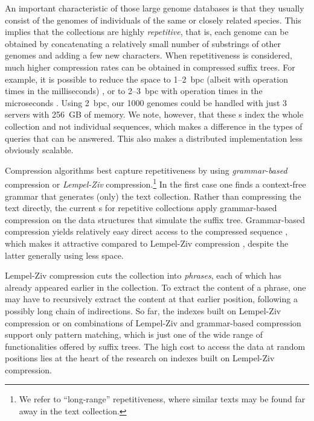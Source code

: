 An important characteristic of those large genome databases is that they
usually consist of the genomes of individuals of the same or closely related
species. This implies that the collections are highly \emph{repetitive}, that
is, each genome can be obtained by concatenating a relatively small number of
substrings of other genomes
and adding a few new characters. When repetitiveness is considered, much higher
compression rates can be obtained in compressed suffix trees. For example, it is possible to reduce
the space to 1--2~bpc (albeit with operation times in the milliseconds)
\cite{Abeliuk2013}, or to 2--3~bpc with operation times in the microseconds
\cite{Navarro2015}. Using 2~bpc, our 1000 genomes could be handled
with just 3 servers with 256~GB of memory. We note, however, that these \CST{}s index
the whole collection and not individual sequences, which makes a difference in
the types of queries that can be answered. This also makes a distributed
implementation less obviously scalable.

Compression algorithms best capture repetitiveness by using \emph{grammar-based}
compression or \emph{Lempel-Ziv} compression.\footnote{We refer to ``long-range''
repetitiveness, where similar texts may be found far away in the text
collection.} In the first case \cite{KY00,CLLPPSS05} one finds a context-free
grammar that generates (only) the text collection.
Rather than compressing the text directly,
the current \CST{}s for repetitive collections \cite{Abeliuk2013,Navarro2015}
apply grammar-based compression on the data structures that simulate the suffix tree.
Grammar-based compression yields relatively easy direct access to the compressed
sequence \cite{BLRSRW15}, which makes it attractive compared to Lempel-Ziv
compression \cite{ZL77}, despite the latter generally using less space.

Lempel-Ziv compression cuts the collection into \emph{phrases}, each of which
has already appeared earlier in the collection. To extract the content of a phrase, one may have
to recursively extract the content at that earlier position, following a 
possibly long chain of indirections.
So far, the indexes built on Lempel-Ziv compression \cite{KN13} or on
combinations of Lempel-Ziv and grammar-based compression \cite{GGKNP12,GGKNP14,GP15}
support only pattern matching, which is just one of the wide range of
functionalities offered by suffix trees. The high cost to access the data
at random positions lies at the heart of the research on indexes built on
Lempel-Ziv compression.

